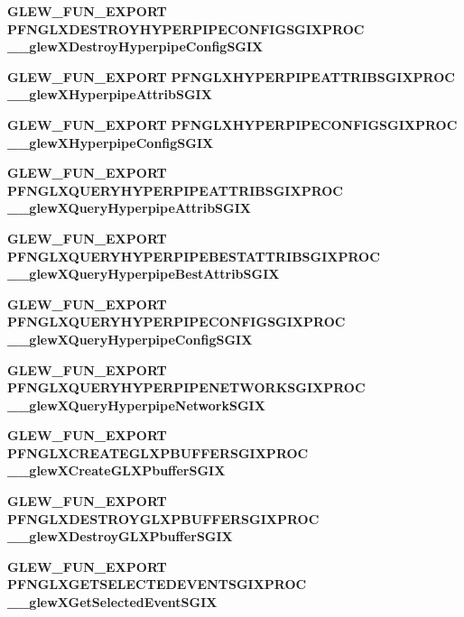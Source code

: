 \begin{DoxyCompactItemize}
{\bf G\+L\+E\+W\+\_\+\+F\+U\+N\+\_\+\+E\+X\+P\+O\+RT} {\bf P\+F\+N\+G\+L\+X\+D\+E\+S\+T\+R\+O\+Y\+H\+Y\+P\+E\+R\+P\+I\+P\+E\+C\+O\+N\+F\+I\+G\+S\+G\+I\+X\+P\+R\+OC} {\bf \+\_\+\+\_\+glew\+X\+Destroy\+Hyperpipe\+Config\+S\+G\+IX}
\item 
{\bf G\+L\+E\+W\+\_\+\+F\+U\+N\+\_\+\+E\+X\+P\+O\+RT} {\bf P\+F\+N\+G\+L\+X\+H\+Y\+P\+E\+R\+P\+I\+P\+E\+A\+T\+T\+R\+I\+B\+S\+G\+I\+X\+P\+R\+OC} {\bf \+\_\+\+\_\+glew\+X\+Hyperpipe\+Attrib\+S\+G\+IX}
\item 
{\bf G\+L\+E\+W\+\_\+\+F\+U\+N\+\_\+\+E\+X\+P\+O\+RT} {\bf P\+F\+N\+G\+L\+X\+H\+Y\+P\+E\+R\+P\+I\+P\+E\+C\+O\+N\+F\+I\+G\+S\+G\+I\+X\+P\+R\+OC} {\bf \+\_\+\+\_\+glew\+X\+Hyperpipe\+Config\+S\+G\+IX}
\item 
{\bf G\+L\+E\+W\+\_\+\+F\+U\+N\+\_\+\+E\+X\+P\+O\+RT} {\bf P\+F\+N\+G\+L\+X\+Q\+U\+E\+R\+Y\+H\+Y\+P\+E\+R\+P\+I\+P\+E\+A\+T\+T\+R\+I\+B\+S\+G\+I\+X\+P\+R\+OC} {\bf \+\_\+\+\_\+glew\+X\+Query\+Hyperpipe\+Attrib\+S\+G\+IX}
\item 
{\bf G\+L\+E\+W\+\_\+\+F\+U\+N\+\_\+\+E\+X\+P\+O\+RT} {\bf P\+F\+N\+G\+L\+X\+Q\+U\+E\+R\+Y\+H\+Y\+P\+E\+R\+P\+I\+P\+E\+B\+E\+S\+T\+A\+T\+T\+R\+I\+B\+S\+G\+I\+X\+P\+R\+OC} {\bf \+\_\+\+\_\+glew\+X\+Query\+Hyperpipe\+Best\+Attrib\+S\+G\+IX}
\item 
{\bf G\+L\+E\+W\+\_\+\+F\+U\+N\+\_\+\+E\+X\+P\+O\+RT} {\bf P\+F\+N\+G\+L\+X\+Q\+U\+E\+R\+Y\+H\+Y\+P\+E\+R\+P\+I\+P\+E\+C\+O\+N\+F\+I\+G\+S\+G\+I\+X\+P\+R\+OC} {\bf \+\_\+\+\_\+glew\+X\+Query\+Hyperpipe\+Config\+S\+G\+IX}
\item 
{\bf G\+L\+E\+W\+\_\+\+F\+U\+N\+\_\+\+E\+X\+P\+O\+RT} {\bf P\+F\+N\+G\+L\+X\+Q\+U\+E\+R\+Y\+H\+Y\+P\+E\+R\+P\+I\+P\+E\+N\+E\+T\+W\+O\+R\+K\+S\+G\+I\+X\+P\+R\+OC} {\bf \+\_\+\+\_\+glew\+X\+Query\+Hyperpipe\+Network\+S\+G\+IX}
\item 
{\bf G\+L\+E\+W\+\_\+\+F\+U\+N\+\_\+\+E\+X\+P\+O\+RT} {\bf P\+F\+N\+G\+L\+X\+C\+R\+E\+A\+T\+E\+G\+L\+X\+P\+B\+U\+F\+F\+E\+R\+S\+G\+I\+X\+P\+R\+OC} {\bf \+\_\+\+\_\+glew\+X\+Create\+G\+L\+X\+Pbuffer\+S\+G\+IX}
\item 
{\bf G\+L\+E\+W\+\_\+\+F\+U\+N\+\_\+\+E\+X\+P\+O\+RT} {\bf P\+F\+N\+G\+L\+X\+D\+E\+S\+T\+R\+O\+Y\+G\+L\+X\+P\+B\+U\+F\+F\+E\+R\+S\+G\+I\+X\+P\+R\+OC} {\bf \+\_\+\+\_\+glew\+X\+Destroy\+G\+L\+X\+Pbuffer\+S\+G\+IX}
\item 
{\bf G\+L\+E\+W\+\_\+\+F\+U\+N\+\_\+\+E\+X\+P\+O\+RT} {\bf P\+F\+N\+G\+L\+X\+G\+E\+T\+S\+E\+L\+E\+C\+T\+E\+D\+E\+V\+E\+N\+T\+S\+G\+I\+X\+P\+R\+OC} {\bf \+\_\+\+\_\+glew\+X\+Get\+Selected\+Event\+S\+G\+IX}
\item 

\end{DoxyCompactItemize}
